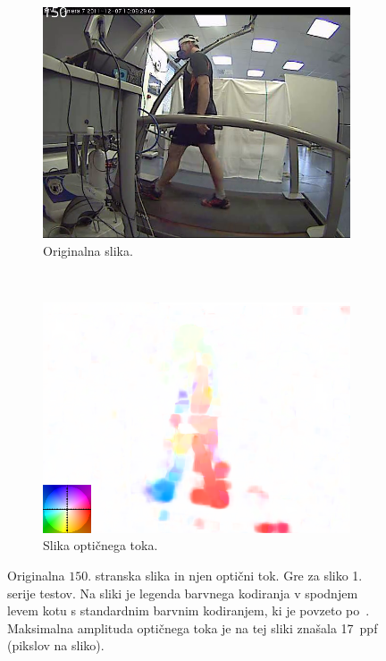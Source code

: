\begin{figure}[!htb]
	\centering
	\begin{subfigure}{0.45\columnwidth}
		\includegraphics[width=\columnwidth]{./Slike/normal-sv-150.png}
		\caption{Originalna slika.}
	\end{subfigure}
	~
	\begin{subfigure}{0.45\columnwidth}
	    \includegraphics[width=\columnwidth, frame]{./Slike/normal-sv-of-coded-150.png}
		\caption{Slika optičnega toka.}
		\label{fig:stage1-of}
	\end{subfigure}
    \caption[Originalna $150$. stranska slika in optični tok]{Originalna $150$. stranska slika in njen optični tok. Gre za sliko 1. serije testov. Na sliki  je legenda barvnega kodiranja v spodnjem levem kotu s standardnim barvnim kodiranjem, ki je povzeto po~\cite{baker2011database}. Maksimalna amplituda optičnega toka je na tej sliki znašala \SI{17}{ppf} (pikslov na sliko).}
    \label{fig:opticni-tok-stage1}
\end{figure}

